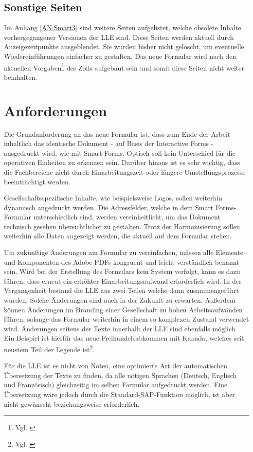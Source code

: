 	
	\subsection{Sonstige Seiten}
	
	Im Anhang \ref{AN:Smart3} sind weitere Seiten aufgelistet, welche obsolete Inhalte vorhergegangener Versionen der \ac{LLE} sind. Diese Seiten werden aktuell durch Anzeigezeitpunkte ausgeblendet. Sie wurden bisher nicht gelöscht, um eventuelle Wiedereinführungen einfacher zu gestalten.
	Das neue Formular wird nach den aktuellen Vorgaben\footnote{Vgl. \cite{ZOLL.2017}} des Zolls aufgebaut sein und somit diese Seiten nicht weiter beinhalten.
	
	
	\FloatBarrier
	\section{Anforderungen}
	\label{ch:Anf}
		Die Grundanforderung an das neue Formular ist, dass zum Ende der Arbeit inhaltlich das identische Dokument - auf Basis der Interactive Forms - ausgedruckt wird, wie mit Smart Forms. Optisch soll kein Unterschied für die operativen Einheiten zu erkennen sein. Darüber hinaus ist es sehr wichtig, dass die Fachbereiche nicht durch Einarbeitungszeit oder längere Umstellungsprozesse beeinträchtigt werden. 
	
		Gesellschaftsspezifische Inhalte, wie beispielsweise Logos, sollen weiterhin dynamisch angedruckt werden.
		Die Adressfelder, welche in dem Smart Forms-Formular unterschiedlich sind, werden vereinheitlicht, um das Dokument technisch gesehen übersichtlicher zu gestalten. Trotz der Harmonisierung sollen weiterhin alle Daten angezeigt werden, die aktuell auf dem Formular stehen. 
		
		Um zukünftige Änderungen am Formular zu vereinfachen, müssen alle Elemente und Komponenten des Adobe \ac{PDF}s kongruent und leicht verständlich benannt sein. Wird bei der Erstellung des Formulars kein System verfolgt, kann es dazu führen, dass erneut ein erhöhter Einarbeitungsaufwand erforderlich wird. In der Vergangenheit bestand die \ac{LLE} aus zwei Teilen welche dann zusammengeführt wurden. Solche Änderungen sind auch in der Zukunft zu erwarten. Außerdem können Änderungen im Branding einer Gesellschaft zu hohen Arbeitsaufwänden führen, solange das Formular weiterhin in einem so komplexen Zustand verwendet wird. Änderungen seitens der Texte innerhalb der \ac{LLE} sind ebenfalls möglich. Ein Beispiel ist hierfür das neue Freihandelsabkommen mit Kanada, welches seit neustem Teil der Legende ist\footnote{Vgl. \cite{ZOLL.2017b}}.
		
		Für die \ac{LLE} ist es nicht von Nöten, eine optimierte Art der automatischen Übersetzung der Texte zu finden, da alle nötigen Sprachen (Deutsch, Englisch und Französisch) gleichzeitig im selben Formular aufgedruckt werden. Eine Übersetzung wäre jedoch durch die Standard-SAP-Funktion möglich, ist aber nicht gewünscht beziehungsweise erforderlich.
		
